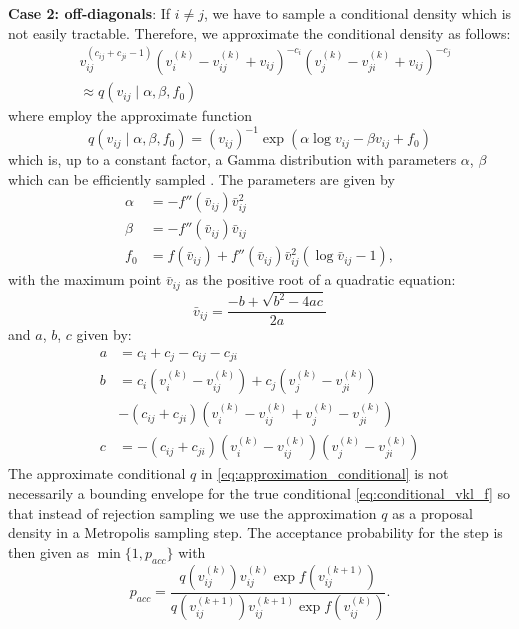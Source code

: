 \documentclass[aps,pre,twocolumn,superscriptaddress,nofootinbib,longbibliography]{revtex4-1}
\begin{document}
{%
{\bf Case 2: off-diagonals}: If $i \neq j$, we have to sample a conditional density which is not easily tractable. Therefore,
we approximate the conditional density as follows:
\begin{equation}
  \begin{aligned}
&  v_{ij}^{(c_{ij}+c_{ji}-1)} (v_i^{(k)} - v_{ij}^{(k)} + v_{ij})^{-c_i} (v_j^{(k)} - v_{ji}^{(k)} + v_{ij})^{-c_j}  \\ 
& \approx q(v_{ij} \mid \alpha, \beta, f_0)
  \end{aligned}
  \label{eq:conditional_vkl_f}
\end{equation}
where employ the approximate function
\begin{equation}
	q(v_{ij} \mid \alpha, \beta, f_0)         = (v_{ij})^{-1} \exp \left( \alpha \log v_{ij} - \beta v_{ij} + f_0 \right)
	\label{eq:approximation_conditional}
\end{equation}
which is, up to a constant factor, a Gamma distribution with parameters $\alpha$, $\beta$ which can be
efficiently sampled \cite{Devroye_Springer86_NonuniformRandom}. The parameters are given by
\begin{subequations}
  \begin{align}
    \alpha & = -f''(\bar{v}_{ij}) \bar{v}_{ij}^2 \label{eq:alpha}\\
    \beta & = -f''(\bar{v}_{ij}) \bar{v}_{ij} \label{eq:beta} \\
    f_0 & = f(\bar{v}_{ij}) +  f''(\bar{v}_{ij}) \bar{v}_{ij}^2 (\log \bar{v}_{ij} -1) \label{eq:f0},
  \end{align}
\end{subequations}
with the maximum point $\bar{v}_{ij}$ as the positive root of a quadratic equation:
\begin{equation}
  \label{eq:maximum_point}
  \bar{v}_{ij} = \frac{-b + \sqrt{b^2-4ac}}{2a}
\end{equation}
and $a$, $b$, $c$ given by:
\begin{subequations}
  \begin{align}
    a &=c_{i}+ c_{j}- c_{ij}- c_{ji} \label{eq:a} \\
    b &= c_{i} (v_i^{(k)} - v_{ij}^{(k)}) + c_{j} (v_j^{(k)} - v_{ji}^{(k)}) \nonumber \\
       & - (c_{ij}+c_{ji}) (v_i^{(k)} - v_{ij}^{(k)} + v_j^{(k)} - v_{ji}^{(k)}) \label{eq:b} \\
    c &= -(c_{ij}+c_{ji}) (v_i^{(k)} - v_{ij}^{(k)}) (v_j^{(k)} - v_{ji}^{(k)}) \label{eq:c}
  \end{align}
\end{subequations}
The approximate conditional $q$ in \eqref{eq:approximation_conditional} is
not necessarily a bounding envelope for the true conditional
\eqref{eq:conditional_vkl_f} so that instead of rejection sampling we
use the approximation $q$ as a proposal density in a Metropolis sampling
step. The acceptance probability for the step is then given as $\min
\{1, p_{acc}\}$ with
\begin{equation}
  \label{eq:pacc}
  p_{acc}=\frac{ q(v_{ij}^{(k)}) v_{ij}^{(k)} \exp f(v_{ij}^{(k+1)})}{ q(v_{ij}^{(k+1)}) v_{ij}^{(k+1)}  \exp f(v_{ij}^{(k)})}.
\end{equation}

}
\end{document}
